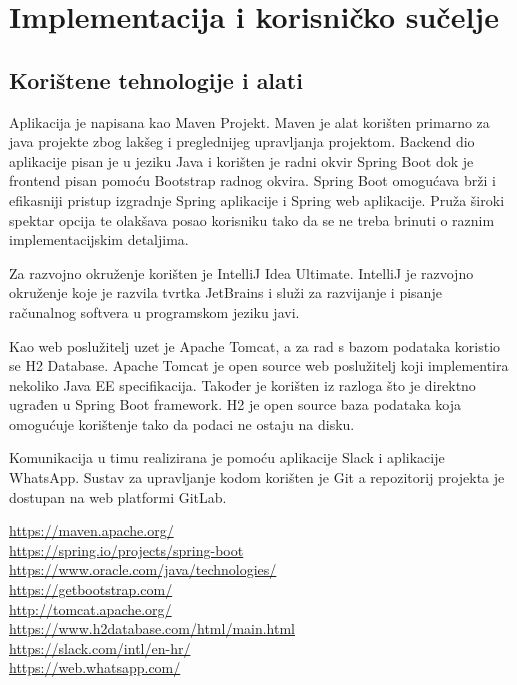 \chapter{Implementacija i korisničko sučelje}


\section{Korištene tehnologije i alati}

\normalfont Aplikacija je napisana kao Maven Projekt. Maven je alat korišten primarno za java projekte zbog lakšeg i preglednijeg upravljanja projektom. Backend dio aplikacije pisan je u jeziku Java i korišten je radni okvir Spring Boot dok je frontend pisan pomoću Bootstrap radnog okvira. Spring Boot omogućava brži i efikasniji pristup izgradnje Spring aplikacije i Spring web aplikacije. Pruža široki spektar opcija te olakšava posao korisniku tako da se ne treba brinuti o raznim implementacijskim detaljima.

\normalfont\noindent Za razvojno okruženje korišten je IntelliJ Idea Ultimate. IntelliJ je razvojno okruženje koje je razvila tvrtka JetBrains i služi za razvijanje i pisanje računalnog softvera u programskom jeziku javi.

\normalfont\noindent Kao web poslužitelj uzet je Apache Tomcat, a za rad s bazom podataka koristio se H2 Database. Apache Tomcat je open source web poslužitelj koji implementira nekoliko Java EE specifikacija. Također je korišten iz razloga što je direktno ugrađen u Spring Boot framework. H2 je open source baza podataka koja omogućuje korištenje tako da podaci ne ostaju na disku.

\normalfont\noindent Komunikacija u timu realizirana je pomoću aplikacije Slack i aplikacije WhatsApp. Sustav za upravljanje kodom korišten je Git a repozitorij projekta je dostupan na web platformi GitLab. 

\bigskip

\noindent\url{https://maven.apache.org/}\\
\url{https://spring.io/projects/spring-boot}\\
\url{https://www.oracle.com/java/technologies/}\\
\url{https://getbootstrap.com/ }\\
\url{http://tomcat.apache.org/}\\
\url{https://www.h2database.com/html/main.html}\\
\url{https://slack.com/intl/en-hr/}\\
\url{https://web.whatsapp.com/}

